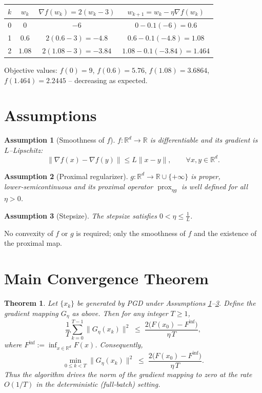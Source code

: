 \documentclass{article}
\newtheorem{theorem}{Theorem}
\newtheorem{assumption}{Assumption}
\newcommand{\prox}{\operatorname{prox}}
\newcommand{\grad}{\nabla}
\newcommand{\R}{\mathbb{R}}
\begin{document}
\begin{center}
\begin{tabular}{c|c|c|c}
$k$ & $w_{k}$ & $\grad f(w_{k})=2(w_{k}-3)$ & $w_{k+1}=w_{k}-\eta\grad f(w_{k})$ \\ \hline
0 & $0$ & $-6$ & $0-0.1(-6)=0.6$ \\
1 & $0.6$ & $2(0.6-3)=-4.8$ & $0.6-0.1(-4.8)=1.08$ \\
2 & $1.08$ & $2(1.08-3)=-3.84$ & $1.08-0.1(-3.84)=1.464$ \\
\end{tabular}
\end{center}
Objective values: $f(0)=9$, $f(0.6)=5.76$, $f(1.08)=3.6864$, $f(1.464)=2.2445$ – decreasing as expected.

\newpage

\section*{Assumptions}
\begin{assumption}[Smoothness of $f$]\label{ass:smooth}
$f:\R^{d}\to\R$ is differentiable and its gradient is $L$–Lipschitz:
\[
\|\grad f(x)-\grad f(y)\|\le L\|x-y\|,\qquad\forall x,y\in\R^{d}.
\]
\end{assumption}
\begin{assumption}[Proximal regularizer]\label{ass:prox}
$g:\R^{d}\to\R\cup\{+\infty\}$ is proper, lower‑semicontinuous and its proximal operator $\prox_{\eta g}$ is well defined for all $\eta>0$.
\end{assumption}
\begin{assumption}[Stepsize]\label{ass:step}
The stepsize satisfies $0<\eta\le \frac{1}{L}$.
\end{assumption}
No convexity of $f$ or $g$ is required; only the smoothness of $f$ and the existence of the proximal map.

\section*{Main Convergence Theorem}
\begin{theorem}\label{thm:main}
Let $\{x_{k}\}$ be generated by PGD under Assumptions \ref{ass:smooth}–\ref{ass:step}. Define the gradient mapping $G_{\eta}$ as above. Then for any integer $T\ge 1$,
\[
\frac{1}{T}\sum_{k=0}^{T-1}\|G_{\eta}(x_{k})\|^{2}
\;\le\;
\frac{2\bigl(F(x_{0})-F^{\inf}\bigr)}{\eta\,T},
\tag{1}
\]
where $F^{\inf}:=\inf_{x\in\R^{d}}F(x)$. Consequently,
\[
\min_{0\le k<T}\|G_{\eta}(x_{k})\|^{2}
\;\le\;
\frac{2\bigl(F(x_{0})-F^{\inf}\bigr)}{\eta\,T}.
\]
Thus the algorithm drives the norm of the gradient mapping to zero at the rate $O(1/T)$ in the deterministic (full‑batch) setting.
\end{theorem}
\end{document}
